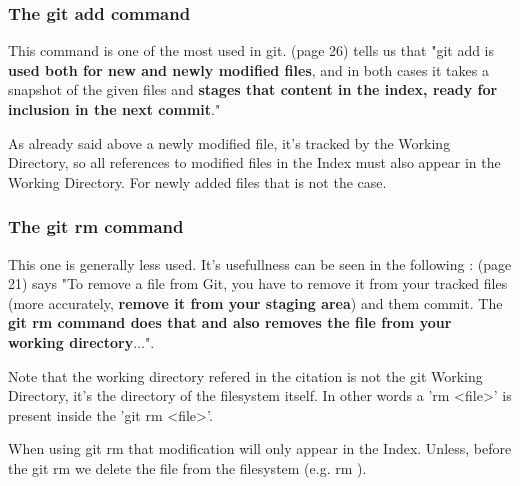 \subsubsection{The git add command}

This command is one of the most used in git. \cite{gitComm} (page 26)
tells us that
"git add is {\bf used both for new and newly modified files},
and in both cases it takes a snapshot of the given files
and {\bf stages that content in the index, ready for inclusion
in the next commit}." \par 
As already said above a newly modified file, it's tracked by
the Working Directory, so all references to modified files in
the Index must also appear in the Working Directory. For newly
added files that is not the case.

\subsubsection{The git rm command}

This one is generally less used. It's usefullness can be
seen in the following : \cite{progit}
(page 21) says "To remove a file from Git, you have to remove it
from your tracked files (more accurately, {\bf remove it from your
staging area}) and them commit. The {\bf git rm command does that
and also removes the file from your working directory}...". \par
Note that the working directory refered in the citation is not
the git Working Directory, it's the directory of the filesystem itself.
In other words a 'rm <file>' is present inside the 'git rm <file>'. \par
When using git rm
that modification will only appear in the Index. Unless, before
the git rm we delete the file from the filesystem (e.g. rm ). \par

%
%
%
%



